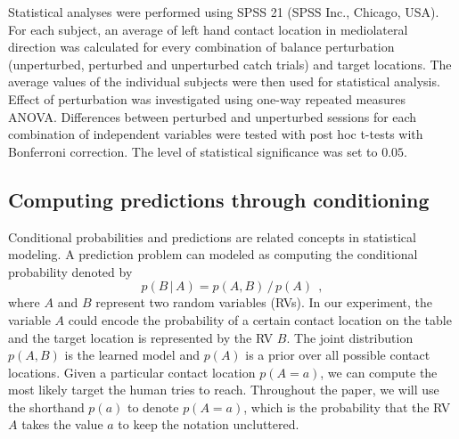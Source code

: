 Statistical analyses were performed using SPSS 21 (SPSS Inc., Chicago, USA). For 
each subject, an average of left hand contact location in mediolateral direction 
was calculated for every combination of balance perturbation (unperturbed, 
perturbed and unperturbed catch trials) and target locations. The average values 
of the individual subjects were then used for statistical analysis. Effect of 
perturbation was investigated using one-way repeated measures ANOVA. Differences 
between perturbed and unperturbed sessions for each combination of independent 
variables were tested with post hoc t-tests with Bonferroni correction. The 
level of statistical significance was set to $0.05$.
    
\subsection*{Computing predictions through conditioning}
%
Conditional probabilities and predictions are related concepts in statistical
modeling. A prediction problem can modeled as computing the conditional
probability denoted by 
\begin{equation}
p(B \, | \, A) = p(A,B) \, / \, p(A) ~~, \label{eq:cond_prob}
\end{equation}
where $A$ and
$B$ represent two random variables (RVs). In our experiment, the variable $A$
could encode the probability of a certain contact location on the table and the
target location is represented by the RV $B$. The joint distribution $p(A,B)$ is
the learned model and $p(A)$ is a prior over all possible contact locations.
Given a particular contact location $p(A=a)$, we can compute the most likely 
target the human tries to reach. Throughout the paper, we will use the shorthand
$p(a)$ to denote $p(A=a)$, which is the probability that the RV $A$ takes the
value $a$ to keep the notation uncluttered. 

